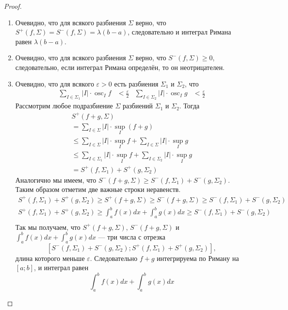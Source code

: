 \documentclass[12pt,a4paper]{article}
\DeclareMathOperator*{\osc}{osc}
\begin{document}
    \begin{proof}
        \begin{enumerate}
            \item Очевидно, что для всякого разбиения $\Sigma$ верно, что $S^+(f, \Sigma) = S^-(f, \Sigma) = \lambda (b-a)$, следовательно и интеграл Римана равен $\lambda (b-a)$.
            
            \item Очевидно, что для всякого разбиения $\Sigma$ верно, что $S^-(f, \Sigma) \geqslant 0$, следовательно, если интеграл Римана определён, то он неотрицателен.
            
            \item Очевидно, что для всякого $\varepsilon > 0$ есть разбиения $\Sigma_1$ и $\Sigma_2$, что
                \begin{align*}
                    \sum_{I \in \Sigma_1} |I| \cdot \osc_I f &< \frac{\varepsilon}{2}&
                    \sum_{I \in \Sigma_2} |I| \cdot \osc_I g &< \frac{\varepsilon}{2}
                \end{align*}
                Рассмотрим любое подразбиение $\Sigma$ разбиений $\Sigma_1$ и $\Sigma_2$. Тогда
                \begin{multline*}
                    S^+(f+g, \Sigma)\\
                    = \sum_{I \in \Sigma} |I| \cdot \sup_I (f + g)\\
                    \leqslant \sum_{I \in \Sigma} |I| \cdot \sup_I f + \sum_{I \in \Sigma} |I| \cdot \sup_I g\\
                    \leqslant \sum_{I \in \Sigma_1} |I| \cdot \sup_I f + \sum_{I \in \Sigma_2} |I| \cdot \sup_I g\\
                    = S^+(f, \Sigma_1) + S^+(g, \Sigma_2) 
                \end{multline*}
                Аналогично мы имеем, что $S^-(f+g, \Sigma) \geqslant S^-(f, \Sigma_1) + S^-(g, \Sigma_2)$. Таким образом отметим две важные строки неравенств.
                \begin{gather*}
                    S^+(f, \Sigma_1) + S^+(g, \Sigma_2) \geqslant S^+(f+g, \Sigma) \geqslant S^-(f+g, \Sigma) \geqslant S^-(f, \Sigma_1) + S^-(g, \Sigma_2)\\
                    S^+(f, \Sigma_1) + S^+(g, \Sigma_2) \geqslant \int_a^b f(x)dx + \int_a^b g(x)dx \geqslant S^-(f, \Sigma_1) + S^-(g, \Sigma_2)\\
                \end{gather*}
                Так мы получаем, что $S^+(f+g, \Sigma)$, $S^-(f+g, \Sigma)$ и $\int_a^b f(x)dx + \int_a^b g(x)dx$ --- три числа с отрезка
                \[\left[S^-(f, \Sigma_1) + S^-(g, \Sigma_2); S^+(f, \Sigma_1) + S^+(g, \Sigma_2)\right],\]
                длина которого меньше $\varepsilon$. Следовательно $f + g$ интегрируема по Риману на $[a; b]$, и интеграл равен
                \[\int_a^b f(x)dx + \int_a^b g(x)dx\]


\end{enumerate}
\end{proof}
\end{document}
